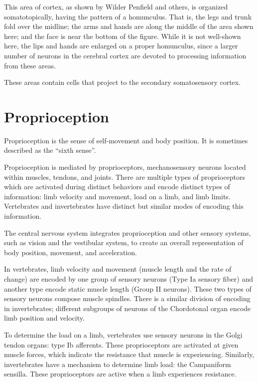 This area of cortex, as shown by Wilder Penfield and others, is organized somatotopically, having the pattern of a homunculus. That is, the legs and trunk fold over the midline; the arms and hands are along the middle of the area shown here; and the face is near the bottom of the figure. While it is not well-shown here, the lips and hands are enlarged on a proper homunculus, since a larger number of neurons in the cerebral cortex are devoted to processing information from these areas.

These areas contain cells that project to the secondary somatosensory cortex.

\hypertarget{proprioception}{%
\section{Proprioception}\label{proprioception}}

Proprioception is the sense of self-movement and body position. It is sometimes described as the ``sixth sense''.

Proprioception is mediated by proprioceptors, mechanosensory neurons located within muscles, tendons, and joints. There are multiple types of proprioceptors which are activated during distinct behaviors and encode distinct types of information: limb velocity and movement, load on a limb, and limb limits. Vertebrates and invertebrates have distinct but similar modes of encoding this information.

The central nervous system integrates proprioception and other sensory systems, such as vision and the vestibular system, to create an overall representation of body position, movement, and acceleration.

In vertebrates, limb velocity and movement (muscle length and the rate of change) are encoded by one group of sensory neurons (Type Ia sensory fiber) and another type encode static muscle length (Group II neurons). These two types of sensory neurons compose muscle spindles. There is a similar division of encoding in invertebrates; different subgroups of neurons of the Chordotonal organ encode limb position and velocity.

To determine the load on a limb, vertebrates use sensory neurons in the Golgi tendon organs: type Ib afferents. These proprioceptors are activated at given muscle forces, which indicate the resistance that muscle is experiencing. Similarly, invertebrates have a mechanism to determine limb load: the Campaniform sensilla. These proprioceptors are active when a limb experiences resistance.

